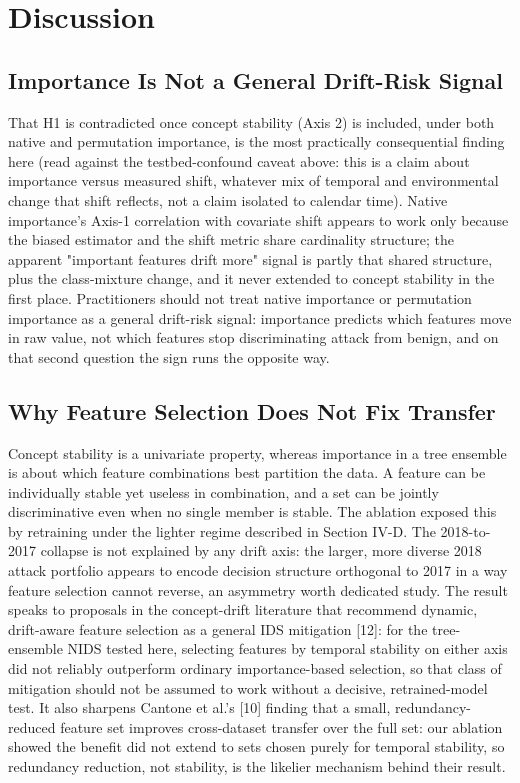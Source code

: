 \documentclass[conference]{IEEEtran}
\begin{document}
\section{Discussion}

\subsection{Importance Is Not a General Drift-Risk Signal}

That H1 is contradicted once concept stability (Axis 2) is included, under both native and permutation importance, is the most practically consequential finding here (read against the testbed-confound caveat above: this is a claim about importance versus measured shift, whatever mix of temporal and environmental change that shift reflects, not a claim isolated to calendar time). Native importance's Axis-1 correlation with covariate shift appears to work only because the biased estimator and the shift metric share cardinality structure; the apparent "important features drift more" signal is partly that shared structure, plus the class-mixture change, and it never extended to concept stability in the first place. Practitioners should not treat native importance or permutation importance as a general drift-risk signal: importance predicts which features move in raw value, not which features stop discriminating attack from benign, and on that second question the sign runs the opposite way.
\par\medskip

\subsection{Why Feature Selection Does Not Fix Transfer}

Concept stability is a univariate property, whereas importance in a tree ensemble is about which feature combinations best partition the data. A feature can be individually stable yet useless in combination, and a set can be jointly discriminative even when no single member is stable. The ablation exposed this by retraining under the lighter regime described in Section IV-D. The 2018-to-2017 collapse is not explained by any drift axis: the larger, more diverse 2018 attack portfolio appears to encode decision structure orthogonal to 2017 in a way feature selection cannot reverse, an asymmetry worth dedicated study. The result speaks to proposals in the concept-drift literature that recommend dynamic, drift-aware feature selection as a general IDS mitigation [12]: for the tree-ensemble NIDS tested here, selecting features by temporal stability on either axis did not reliably outperform ordinary importance-based selection, so that class of mitigation should not be assumed to work without a decisive, retrained-model test. It also sharpens Cantone et al.'s [10] finding that a small, redundancy-reduced feature set improves cross-dataset transfer over the full set: our ablation showed the benefit did not extend to sets chosen purely for temporal stability, so redundancy reduction, not stability, is the likelier mechanism behind their result.
\par\medskip
\end{document}
